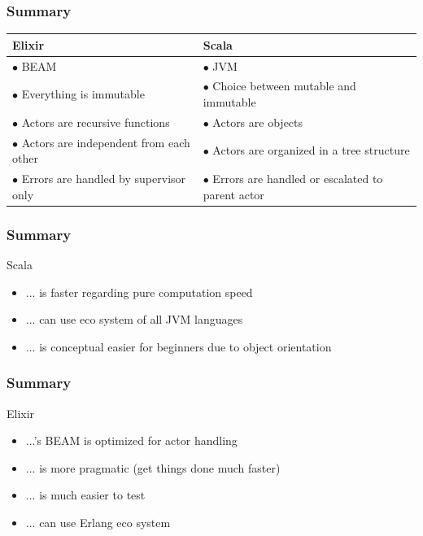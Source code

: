 \documentclass{beamer}
\begin{document}
\begin{frame}
\frametitle{Summary}
\begin{table}
\begin{tabular}{p{5cm} p{5cm}}
\toprule
\textbf{Elixir} & \textbf{Scala}\\
\midrule
$\bullet$ BEAM & $\bullet$ JVM \\
$\bullet$ Everything is immutable & $\bullet$ Choice between mutable and immutable\\
$\bullet$ Actors are recursive functions & $\bullet$ Actors are objects\\
$\bullet$ Actors are independent from each other & $\bullet$ Actors are organized in a tree structure \\
$\bullet$ Errors are handled by supervisor only & $\bullet$ Errors are handled or escalated to parent actor\\\bottomrule
\end{tabular}
\end{table}
\end{frame}



\begin{frame}
\frametitle{Summary}
\Huge{Scala}
\Large
\begin{itemize}[<+->]
\item ... is faster regarding pure computation speed
\item ... can use eco system of all JVM languages
\item ... is conceptual easier for beginners due to object orientation
\end{itemize}
\end{frame}


\begin{frame}
\frametitle{Summary}
\Huge{Elixir}
\Large
\begin{itemize}[<+->]
\item ...'s BEAM is optimized for actor handling
\item ... is more pragmatic (get things done much faster)
\item ... is much easier to test
\item ... can use Erlang eco system
\end{itemize}
\end{frame}

\end{document}
